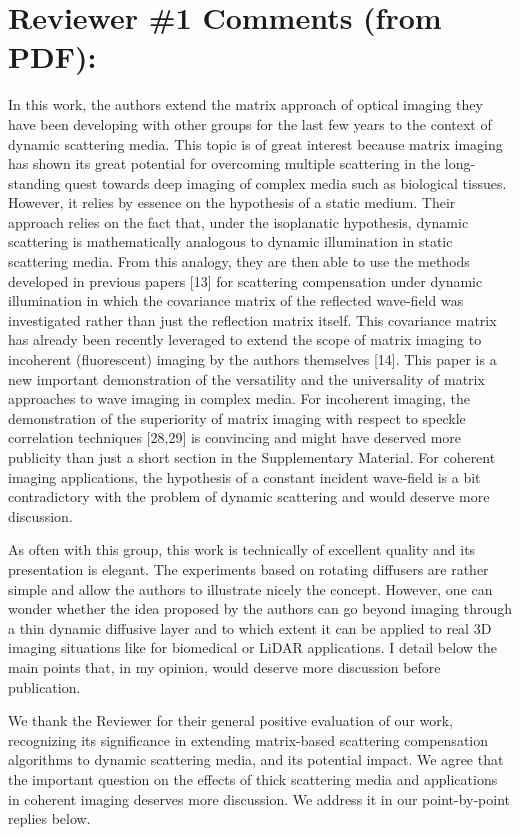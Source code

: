 \documentclass[12pt]{article}
\newenvironment{ourresponse}
    {\begin{tcolorbox}[width=\linewidth,breakable,enhanced,colback=gray!5,colframe=responsecolor!50,title=Response,left=5pt,right=5pt]}
    {\end{tcolorbox}}
\begin{document}
\section{Reviewer \#1 Comments (from PDF):}

In this work, the authors extend the matrix approach of optical imaging they have been developing with other groups for the last few years to the context of dynamic scattering media. This topic is of great interest because matrix imaging has shown its great potential for overcoming multiple scattering in the long-standing quest towards deep imaging of complex media such as biological tissues. However, it relies by essence on the hypothesis of a static medium. Their approach relies on the fact that, under the isoplanatic hypothesis, dynamic scattering is mathematically analogous to dynamic illumination in static scattering media. From this analogy, they are then able to use the methods developed in previous papers [13] for scattering compensation under dynamic illumination in which the covariance matrix of the reflected wave-field was investigated rather than just the reflection matrix itself. This covariance matrix has already been recently leveraged to extend the scope of matrix imaging to incoherent (fluorescent) imaging by the authors themselves [14]. This paper is a new important demonstration of the versatility and the universality of matrix approaches to wave imaging in complex media. For incoherent imaging, the demonstration of the superiority of matrix imaging with respect to speckle correlation techniques [28,29] is convincing and might have deserved more publicity than just a short section in the Supplementary Material. For coherent imaging applications, the hypothesis of a constant incident wave-field is a bit contradictory with the problem of dynamic scattering and would deserve more discussion.  

As often with this group, this work is technically of excellent quality and its presentation is elegant. The experiments based on rotating diffusers are rather simple and allow the authors to illustrate nicely the concept. However, one can wonder whether the idea proposed by the authors can go beyond imaging through a thin dynamic diffusive layer and to which extent it can be applied to real 3D imaging situations like for biomedical or LiDAR applications. I detail below the main points that, in my opinion, would deserve more discussion before publication.

\begin{ourresponse}
    We thank the Reviewer for their general positive evaluation of our work, recognizing its significance in extending matrix-based scattering compensation algorithms to dynamic scattering media, and its potential impact.
    We agree that the important question on the effects of thick scattering media and applications in coherent imaging deserves more discussion. We address it in our point-by-point replies below.
\end{ourresponse}
\end{document}
